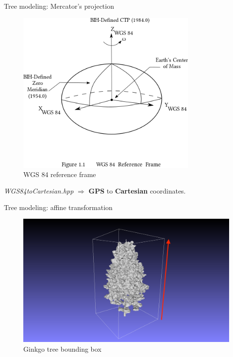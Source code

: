 \documentclass[10pt]{beamer}
\begin{document}
\begin{frame}{Tree modeling: Mercator's projection}
\begin{figure}[H]
\begin{minipage}{0.49\textwidth}
        \includegraphics[width=0.8\textwidth]{images/WGS_84_reference_frame.png}
        \caption{WGS 84 reference frame\cite{mercator-proj}}
    \end{minipage}
\end{figure}

\textit{WGS84toCartesian.hpp} $\Longrightarrow$ \textbf{GPS} to \textbf{Cartesian} coordinates.
\end{frame}

\begin{frame}{Tree modeling: affine transformation}
  \Large
  \begin{figure}[H]
    \centering
    \includegraphics[width=1\textwidth]{images/ginkgo-bbox.png}
    \caption{Ginkgo tree bounding box}
\end{figure}
\end{frame}
\end{document}
